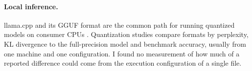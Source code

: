 \paragraph{Local inference.}
llama.cpp and its GGUF format are the common path for running quantized models on consumer
CPUs \citep{llamacpp}. Quantization studies compare formats by perplexity, KL divergence to the
full-precision model and benchmark accuracy, usually from one machine and one configuration.
I found no measurement of how much of a reported difference could come from the execution
configuration of a single file.
